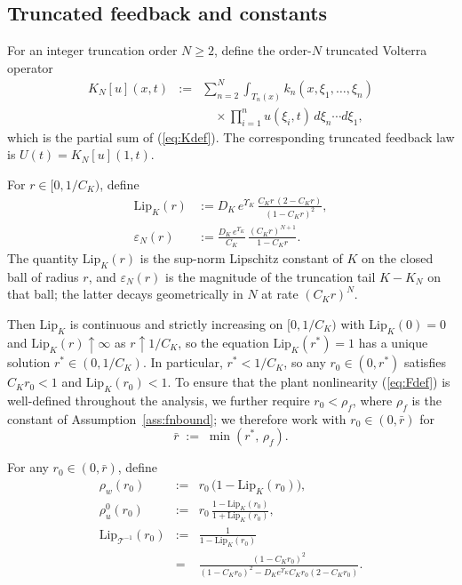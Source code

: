 \documentclass[10pt,a4paper]{amsart}
\newcommand{\Tcal}{\mathcal{T}}
\newcommand{\Lipk}{\mathrm{Lip}_K}
\newcommand{\LipT}{\mathrm{Lip}_{\Tcal^{-1}}}
\newcommand{\eps}{\varepsilon}
\begin{document}
\subsection{Truncated feedback and constants}\label{sec:truncfeedback}

For an integer truncation order $N \ge 2$, define the order-$N$ truncated Volterra operator
\begin{eqnarray}
K_N[u](x,t) &:=& \sum_{n=2}^N \int_{T_n(x)} k_n(x,\xi_1,\ldots,\xi_n) \nonumber \\
&& \quad \times \prod_{i=1}^n u(\xi_i,t)\, d\xi_n \cdots d\xi_1,
\label{eq:KNdef}
\end{eqnarray}
which is the partial sum of (\ref{eq:Kdef}). The corresponding truncated feedback law is $U(t) = K_N[u](1,t)$.

For $r \in [0, 1/C_K)$, define
\begin{align}
\Lipk(r) &:= D_K\, e^{\Upsilon_K}\, \frac{C_K r\,(2 - C_K r)}{(1 - C_K r)^2}, \label{eq:LipKdef}\\
\eps_N(r) &:= \frac{D_K\, e^{\Upsilon_K}}{C_K}\, \frac{(C_K r)^{N+1}}{1 - C_K r}.
\label{eq:epsNdef}
\end{align}
The quantity $\Lipk(r)$ is the sup-norm Lipschitz constant of $K$ on the closed ball of radius $r$, and $\eps_N(r)$ is the magnitude of the truncation tail $K - K_N$ on that ball; the latter decays geometrically in $N$ at rate $(C_K r)^N$.

Then $\Lipk$ is continuous and strictly increasing on $[0, 1/C_K)$ with $\Lipk(0) = 0$ and $\Lipk(r) \uparrow \infty$ as $r \uparrow 1/C_K$, so the equation $\Lipk(r^*) = 1$ has a unique solution $r^* \in (0, 1/C_K)$. In particular, $r^* < 1/C_K$, so any $r_0 \in (0, r^*)$ satisfies $C_K r_0 < 1$ and $\Lipk(r_0) < 1$. To ensure that the plant nonlinearity (\ref{eq:Fdef}) is well-defined throughout the analysis, we further require $r_0 < \rho_f$, where $\rho_f$ is the constant of Assumption~\ref{ass:fnbound}; we therefore work with $r_0 \in (0, \bar r)$ for
\begin{equation}
\bar r \;:=\; \min(r^*,\, \rho_f).
\label{eq:rbardef}
\end{equation}

For any $r_0 \in (0, \bar r)$, define
\begin{eqnarray}
\rho_w(r_0) &:=& r_0\,\bigl(1 - \Lipk(r_0)\bigr), \label{eq:rhowdef}\\
\rho_u^0(r_0) &:=& r_0\,\frac{1 - \Lipk(r_0)}{1 + \Lipk(r_0)}, \label{eq:rhou0def}\\
\LipT(r_0) &:=& \frac{1}{1 - \Lipk(r_0)} \nonumber \\
&=& \frac{(1-C_K r_0)^2}{(1-C_K r_0)^2 - D_K e^{\Upsilon_K} C_K r_0 (2 - C_K r_0)}.
\label{eq:LipTinvdef}
\end{eqnarray}
\end{document}
